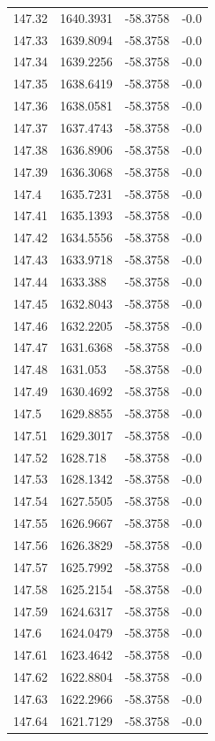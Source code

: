 \begin{table}[H]
\begin{tabular}{llll}
147.32 & 1640.3931 & -58.3758 & -0.0 \\
147.33 & 1639.8094 & -58.3758 & -0.0 \\
147.34 & 1639.2256 & -58.3758 & -0.0 \\
147.35 & 1638.6419 & -58.3758 & -0.0 \\
147.36 & 1638.0581 & -58.3758 & -0.0 \\
147.37 & 1637.4743 & -58.3758 & -0.0 \\
147.38 & 1636.8906 & -58.3758 & -0.0 \\
147.39 & 1636.3068 & -58.3758 & -0.0 \\
147.4 & 1635.7231 & -58.3758 & -0.0 \\
147.41 & 1635.1393 & -58.3758 & -0.0 \\
147.42 & 1634.5556 & -58.3758 & -0.0 \\
147.43 & 1633.9718 & -58.3758 & -0.0 \\
147.44 & 1633.388 & -58.3758 & -0.0 \\
147.45 & 1632.8043 & -58.3758 & -0.0 \\
147.46 & 1632.2205 & -58.3758 & -0.0 \\
147.47 & 1631.6368 & -58.3758 & -0.0 \\
147.48 & 1631.053 & -58.3758 & -0.0 \\
147.49 & 1630.4692 & -58.3758 & -0.0 \\
147.5 & 1629.8855 & -58.3758 & -0.0 \\
147.51 & 1629.3017 & -58.3758 & -0.0 \\
147.52 & 1628.718 & -58.3758 & -0.0 \\
147.53 & 1628.1342 & -58.3758 & -0.0 \\
147.54 & 1627.5505 & -58.3758 & -0.0 \\
147.55 & 1626.9667 & -58.3758 & -0.0 \\
147.56 & 1626.3829 & -58.3758 & -0.0 \\
147.57 & 1625.7992 & -58.3758 & -0.0 \\
147.58 & 1625.2154 & -58.3758 & -0.0 \\
147.59 & 1624.6317 & -58.3758 & -0.0 \\
147.6 & 1624.0479 & -58.3758 & -0.0 \\
147.61 & 1623.4642 & -58.3758 & -0.0 \\
147.62 & 1622.8804 & -58.3758 & -0.0 \\
147.63 & 1622.2966 & -58.3758 & -0.0 \\
147.64 & 1621.7129 & -58.3758 & -0.0 \\

\end{tabular}
\end{table}
